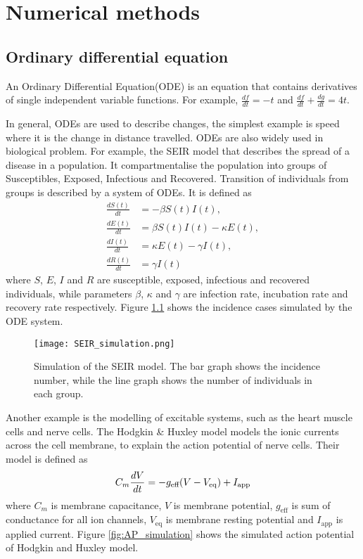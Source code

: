 \chapter{Numerical methods}
\label{chap:numerical-methods}
\section{Ordinary differential equation}
An Ordinary Differential Equation(ODE) is an equation that contains derivatives of single independent variable functions. For example, $\frac{df}{dt}=-t$ and $\frac{df}{dt} + \frac{dg}{dt} = 4t$. 

In general, ODEs are used to describe changes, the simplest example is speed where it is the change in distance travelled. ODEs are also widely used in biological problem. For example, the SEIR model that describes the spread of a disease in a population. It compartmentalise the population into groups of Susceptibles, Exposed, Infectious and Recovered. Transition of individuals from groups is described by a system of ODEs. It is defined as 
\begin{align}
\label{model:SEIR}
    \frac{dS(t)}{dt} &= -\beta S(t)I(t), \\
    \frac{dE(t)}{dt} &= \beta S(t)I(t) - \kappa E(t), \\
    \frac{dI(t)}{dt} &= \kappa E(t) - \gamma I(t), \\
    \frac{dR(t)}{dt} &= \gamma I(t)
\end{align}
where $S$, $E$, $I$ and $R$ are susceptible, exposed, infectious and recovered individuals, while parameters $\beta$, $\kappa$ and $\gamma$ are infection rate, incubation rate and recovery rate respectively. Figure \ref{fig:SEIR_simulation} shows the incidence cases simulated by the ODE system. 

\begin{figure}
    \texttt{[image: SEIR\_simulation.png]}
    \caption{Simulation of the SEIR model. The bar graph shows the incidence number, while the line graph shows the number of individuals in each group.}
    \label{fig:SEIR_simulation}
\end{figure}

Another example is the modelling of excitable systems, such as the heart muscle cells and nerve cells. The Hodgkin \& Huxley model models the ionic currents across the cell membrane, to explain the action potential of nerve cells.%
Their model is defined as
\begin{equation}
\label{model:HH}
    C_m \frac{dV}{dt} = -g_{\text{eff}}(V - V_{\text{eq}}) + I_{\text{app}} \\
\end{equation}
where $C_m$ is membrane capacitance, $V$ is membrane potential, $g_{\text{eff}}$ is sum of conductance for all ion channels, $V_{\text{eq}}$ is membrane resting potential and $I_{\text{app}}$ is applied current. Figure \ref{fig:AP_simulation} shows the simulated action potential of Hodgkin and Huxley model.

